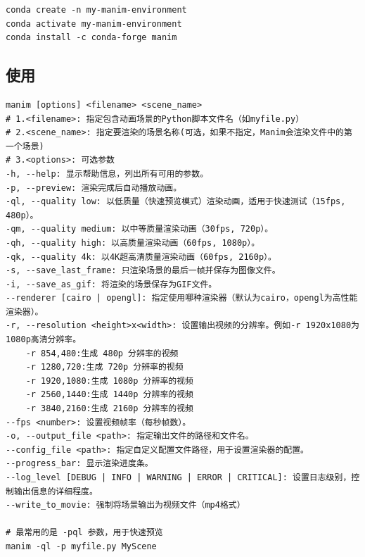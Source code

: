 \begin{lstlisting}[style=demostyle,numbers=none]
conda create -n my-manim-environment
conda activate my-manim-environment    
conda install -c conda-forge manim
\end{lstlisting}

\subsection{使用}
\begin{lstlisting}[style=demostyle,numbers=none]
manim [options] <filename> <scene_name>
# 1.<filename>: 指定包含动画场景的Python脚本文件名（如myfile.py）
# 2.<scene_name>: 指定要渲染的场景名称(可选，如果不指定，Manim会渲染文件中的第一个场景)
# 3.<options>: 可选参数
-h, --help: 显示帮助信息，列出所有可用的参数。
-p, --preview: 渲染完成后自动播放动画。
-ql, --quality low: 以低质量（快速预览模式）渲染动画，适用于快速测试（15fps, 480p）。
-qm, --quality medium: 以中等质量渲染动画（30fps, 720p）。
-qh, --quality high: 以高质量渲染动画（60fps, 1080p）。
-qk, --quality 4k: 以4K超高清质量渲染动画（60fps, 2160p）。
-s, --save_last_frame: 只渲染场景的最后一帧并保存为图像文件。
-i, --save_as_gif: 将渲染的场景保存为GIF文件。
--renderer [cairo | opengl]: 指定使用哪种渲染器（默认为cairo，opengl为高性能渲染器）。
-r, --resolution <height>x<width>: 设置输出视频的分辨率。例如-r 1920x1080为1080p高清分辨率。
    -r 854,480:生成 480p 分辨率的视频
    -r 1280,720:生成 720p 分辨率的视频
    -r 1920,1080:生成 1080p 分辨率的视频
    -r 2560,1440:生成 1440p 分辨率的视频
    -r 3840,2160:生成 2160p 分辨率的视频
--fps <number>: 设置视频帧率（每秒帧数）。
-o, --output_file <path>: 指定输出文件的路径和文件名。
--config_file <path>: 指定自定义配置文件路径，用于设置渲染器的配置。
--progress_bar: 显示渲染进度条。
--log_level [DEBUG | INFO | WARNING | ERROR | CRITICAL]: 设置日志级别，控制输出信息的详细程度。
--write_to_movie: 强制将场景输出为视频文件（mp4格式）

# 最常用的是 -pql 参数，用于快速预览
manim -ql -p myfile.py MyScene
\end{lstlisting}    

